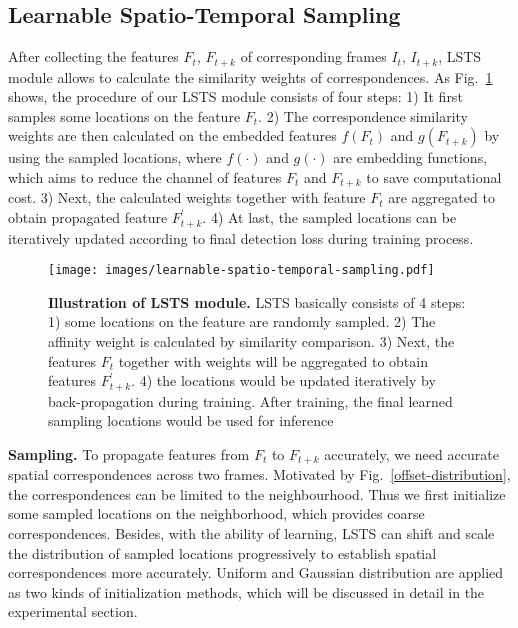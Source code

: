 \documentclass[runningheads]{llncs}
\begin{document}
\subsection{Learnable Spatio-Temporal Sampling}\label{subsec:LSTS}
 After collecting the features $F_t$, $F_{t+k}$ of corresponding frames $I_t$, $I_{t+k}$, LSTS module allows to calculate the similarity weights of correspondences. As Fig.~\ref{lsts-module} shows, the procedure of our LSTS module consists of four steps:  
1) It first samples some locations on the feature $F_t$. 
2) The correspondence similarity weights are then calculated on the embedded features $f(F_t)$ and $g(F_{t+k})$ by using the sampled locations, where $f(\cdot)$ and $g(\cdot)$ are embedding functions, which aims to reduce the channel of features $F_t$ and $F_{t+k}$ to save computational cost.
 3) Next, the calculated weights together with feature $F_t$ are aggregated to obtain propagated feature $F_{t+k}^{'}$. 
 4) At last, the sampled locations can be iteratively updated according to final detection loss during training process. 


\begin{figure}[t]
\centering
\texttt{[image: images/learnable-spatio-temporal-sampling.pdf]}
\caption{
\textbf{Illustration of LSTS module.} 
LSTS basically consists of 4 steps: 1) some locations on the feature are randomly sampled. 2) The affinity weight is calculated by similarity comparison. 3) Next, the features $F_t$ together with weights will be aggregated to obtain features $F_{t+k}^{'}$. 4) the locations would be updated iteratively by back-propagation during training.
After training, the final learned sampling locations would be used for inference}
\label{lsts-module}
\end{figure}

\noindent \textbf{Sampling.} To propagate features from $F_t$ to $F_{t+k}$ accurately, we need accurate spatial correspondences across two frames. Motivated by Fig.~\ref{offset-distribution}, the correspondences can be limited to the neighbourhood. Thus we first initialize some sampled locations on the neighborhood, which provides coarse correspondences. Besides, with the ability of learning, LSTS can shift and scale the distribution of sampled locations progressively to establish spatial correspondences more accurately. Uniform and Gaussian distribution are applied as two kinds of initialization methods, which will be discussed in detail in the experimental section.
\end{document}
